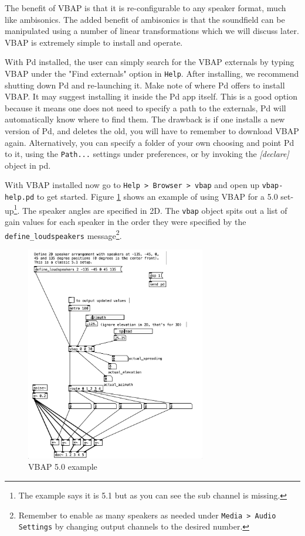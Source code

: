 The benefit of VBAP is that it is re-configurable to any speaker format, much like ambisonics. The added benefit of ambisonics is that the soundfield can be manipulated using a number of linear transformations which we will discuss later. VBAP is extremely simple to install and operate. 

With Pd installed, the user can simply search for the VBAP externals by typing VBAP under the "Find externals" option in \texttt{Help}. After installing, we recommend shutting down Pd and re-launching it. Make note of where Pd offers to install VBAP. It may suggest installing it inside the Pd app itself. This is a good option because it means one does not need to specify a path to the externals, Pd will automatically know where to find them. The drawback is if one installs a new version of Pd, and deletes the old, you will have to remember to download VBAP again. Alternatively, you can specify a folder of your own choosing and point Pd to it, using the \texttt{Path...} settings under preferences, or by invoking the \textit{[declare]} object in pd.

With VBAP installed now go to \texttt{Help > Browser > vbap} and open up \texttt{vbap-help.pd} to get started. Figure \ref{fig:vbap-5.0} shows an example of using VBAP for a 5.0 set-up\footnote{The example says it is 5.1 but as you can see the sub channel is missing.}. The speaker angles are specified in 2D. The \texttt{vbap} object spits out a list of gain values for each speaker in the order they were specified by the \texttt{define\_loudspeakers} message\footnote{Remember to enable as many speakers as needed under \texttt{Media > Audio Settings} by changing output channels to the desired number.}.

\begin{figure}[ht!]%
\centering
\includegraphics[width=0.7\textwidth]{img/vbap-5.1.png} 
\caption{VBAP 5.0 example}
\label{fig:vbap-5.0}
\end{figure}

